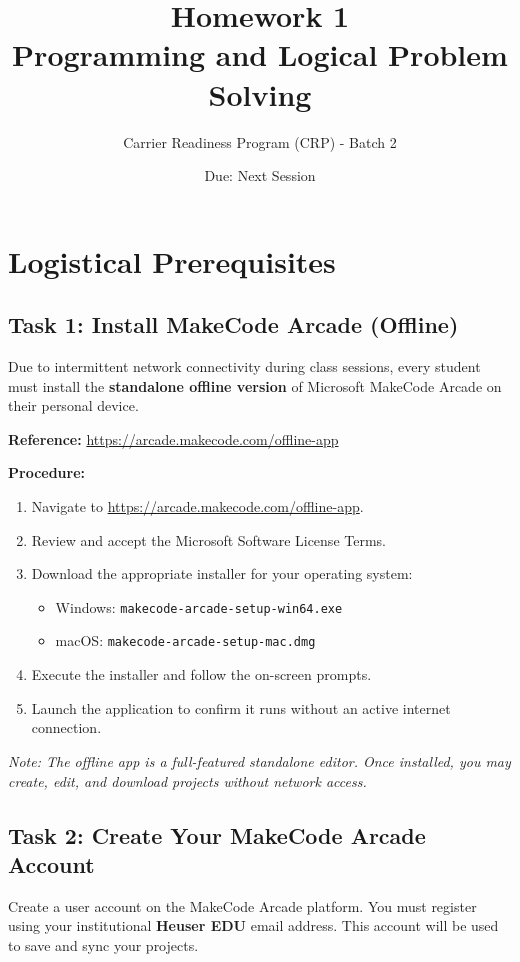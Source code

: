 \documentclass[11pt,a4paper]{article}
\title{\textbf{Homework 1}\\Programming and Logical Problem Solving}
\author{Carrier Readiness Program (CRP) - Batch 2}
\date{Due: Next Session}
\begin{document}
	
	\maketitle
	\thispagestyle{fancy}
	
	\section*{Logistical Prerequisites}
	
	\subsection*{Task 1: Install MakeCode Arcade (Offline)}
	Due to intermittent network connectivity during class sessions, every student must install the \textbf{standalone offline version} of Microsoft MakeCode Arcade on their personal device.
	
	\textbf{Reference:} \url{https://arcade.makecode.com/offline-app}
	
	\textbf{Procedure:}
	\begin{enumerate}
		\item Navigate to \url{https://arcade.makecode.com/offline-app}.
		\item Review and accept the Microsoft Software License Terms.
		\item Download the appropriate installer for your operating system:
		\begin{itemize}
			\item Windows: \texttt{makecode-arcade-setup-win64.exe}
			\item macOS: \texttt{makecode-arcade-setup-mac.dmg}
		\end{itemize}
		\item Execute the installer and follow the on-screen prompts.
		\item Launch the application to confirm it runs without an active internet connection.
	\end{enumerate}
	
	\noindent\textit{Note: The offline app is a full-featured standalone editor. Once installed, you may create, edit, and download projects without network access.}
	
	\subsection*{Task 2: Create Your MakeCode Arcade Account}
	Create a user account on the MakeCode Arcade platform. You must register using your institutional \textbf{Heuser EDU} email address. This account will be used to save and sync your projects.
	
\end{document}
